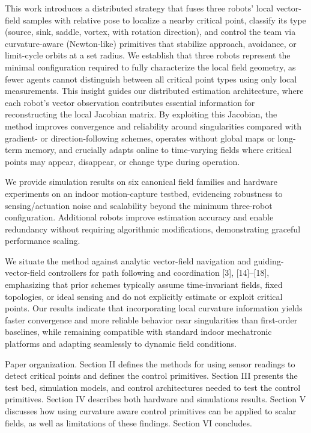 \documentclass[lettersize,journal]{IEEEtran}
\begin{document}
This work introduces a distributed strategy that fuses three robots' local vector-field samples with relative pose to localize a nearby critical point, classify its type (source, sink, saddle, vortex, with rotation direction), and control the team via curvature-aware (Newton-like) primitives that stabilize approach, avoidance, or limit-cycle orbits at a set radius. We establish that three robots represent the minimal configuration required to fully characterize the local field geometry, as fewer agents cannot distinguish between all critical point types using only local measurements. This insight guides our distributed estimation architecture, where each robot's vector observation contributes essential information for reconstructing the local Jacobian matrix. By exploiting this Jacobian, the method improves convergence and reliability around singularities compared with gradient- or direction-following schemes, operates without global maps or long-term memory, and crucially adapts online to time-varying fields where critical points may appear, disappear, or change type during operation.

We provide simulation results on six canonical field families and hardware experiments on an indoor motion-capture testbed, evidencing robustness to sensing/actuation noise and scalability beyond the minimum three-robot configuration. Additional robots improve estimation accuracy and enable redundancy without requiring algorithmic modifications, demonstrating graceful performance scaling.

We situate the method against analytic vector-field navigation and guiding-vector-field controllers for path following and coordination [3], [14]–[18], emphasizing that prior schemes typically assume time-invariant fields, fixed topologies, or ideal sensing and do not explicitly estimate or exploit critical points. Our results indicate that incorporating local curvature information yields faster convergence and more reliable behavior near singularities than first-order baselines, while remaining compatible with standard indoor mechatronic platforms and adapting seamlessly to dynamic field conditions.

Paper organization. Section II defines the methods for using sensor readings to detect critical points and defines the control primitives. Section III presents the test bed, simulation models, and control architectures needed to test the control primitives. Section IV describes both hardware and simulations results. Section V discusses how using curvature aware control primitives can be applied to scalar fields, as well as limitations of these findings. Section VI concludes.
\end{document}
